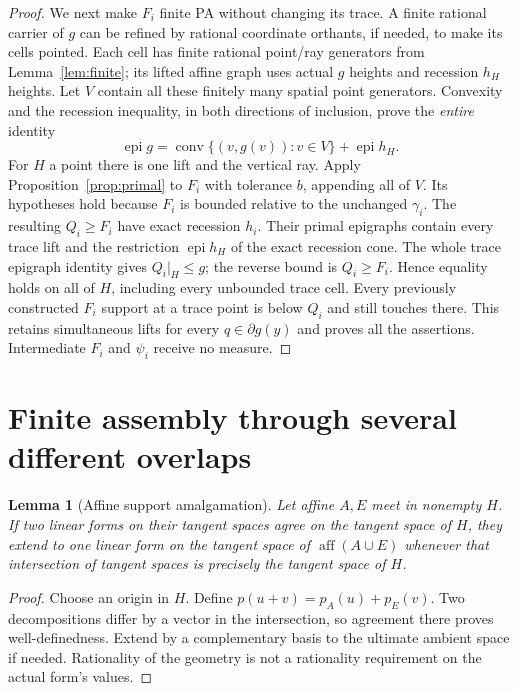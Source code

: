 \documentclass[11pt]{article}
\newtheorem{lemma}[theorem]{Lemma}
\newcommand{\epi}{\operatorname{epi}}
\newcommand{\conv}{\operatorname{conv}}
\newcommand{\aff}{\operatorname{aff}}
\begin{document}
\begin{proof}
We next make $F_i$ finite PA without changing its trace. A finite rational carrier of $g$ can be refined by rational coordinate orthants, if needed, to make its cells pointed. Each cell has finite rational point/ray generators from Lemma~\ref{lem:finite}; its lifted affine graph uses actual $g$ heights and recession $h_H$ heights. Let $V$ contain all these finitely many spatial point generators. Convexity and the recession inequality, in both directions of inclusion, prove the \emph{entire} identity
\[
\epi g=\conv\{(v,g(v)):v\in V\}+\epi h_H.
\]
For $H$ a point there is one lift and the vertical ray. Apply Proposition~\ref{prop:primal} to $F_i$ with tolerance $b$, appending all of $V$. Its hypotheses hold because $F_i$ is bounded relative to the unchanged $\gamma_i$. The resulting $Q_i\geq F_i$ have exact recession $h_i$. Their primal epigraphs contain every trace lift and the restriction $\epi h_H$ of the exact recession cone. The whole trace epigraph identity gives $Q_i|_H\leq g$; the reverse bound is $Q_i\geq F_i$. Hence equality holds on all of $H$, including every unbounded trace cell. Every previously constructed $F_i$ support at a trace point is below $Q_i$ and still touches there. This retains simultaneous lifts for every $q\in\partial g(y)$ and proves all the assertions. Intermediate $F_i$ and $\psi_i$ receive no measure.
\end{proof}

\section{Finite assembly through several different overlaps}
\begin{lemma}[Affine support amalgamation]\label{lem:amalgam}
Let affine $A,E$ meet in nonempty $H$. If two linear forms on their tangent spaces agree on the tangent space of $H$, they extend to one linear form on the tangent space of $\aff(A\cup E)$ whenever that intersection of tangent spaces is precisely the tangent space of $H$.
\end{lemma}
\begin{proof}
Choose an origin in $H$. Define $p(u+v)=p_A(u)+p_E(v)$. Two decompositions differ by a vector in the intersection, so agreement there proves well-definedness. Extend by a complementary basis to the ultimate ambient space if needed. Rationality of the geometry is not a rationality requirement on the actual form's values.
\end{proof}
\end{document}
